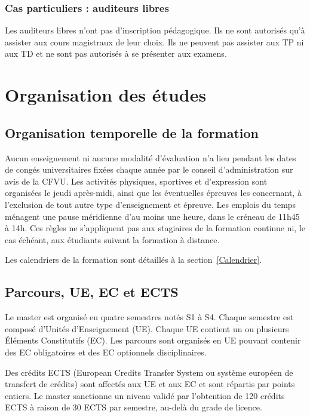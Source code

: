 \documentclass[a4paper,11pt]{article}
\begin{document}
\subsubsection{Cas particuliers : auditeurs libres}
Les auditeurs libres n'ont pas d'inscription pédagogique. Ils ne sont autorisés qu'à assister aux cours magistraux de leur choix. Ils ne peuvent pas assister aux TP ni aux TD et ne sont pas autorisés à se présenter aux examens.

\section{Organisation des études}\label{Organisation}

\subsection{Organisation temporelle de la formation}\label{Temporel}

Aucun enseignement ni aucune modalité d'évaluation n'a lieu pendant les dates de congés universitaires fixées chaque année par le conseil d'administration sur avis de la CFVU. Les activités physiques, sportives et d'expression sont organisées le jeudi après-midi, ainsi que les éventuelles épreuves les concernant, à l'exclusion de tout autre type d'enseignement et épreuve. Les emplois du temps ménagent une pause méridienne d'au moins une heure, dans le créneau de 11h45 à 14h. Ces règles ne s'appliquent pas aux stagiaires de la formation continue ni, le cas échéant, aux étudiants suivant la formation à distance.

Les calendriers de la formation sont détaillés à la section~\ref{Calendrier}.

\subsection{Parcours, UE, EC et ECTS}

Le master est organisé en quatre semestres notés S1 à S4. Chaque semestre est composé d'Unités d'Enseignement (UE). Chaque UE contient un ou plusieurs Éléments Constitutifs (EC). Les parcours sont organisés en UE pouvant contenir des EC obligatoires et des EC optionnels disciplinaires.

Des crédits ECTS (European Credits Transfer System ou système européen de transfert de crédits) sont affectés aux UE et aux EC et sont répartis par points entiers. Le master sanctionne un niveau validé par l'obtention de 120 crédits ECTS à raison de 30 ECTS par semestre, au-delà du grade de licence.
\end{document}
